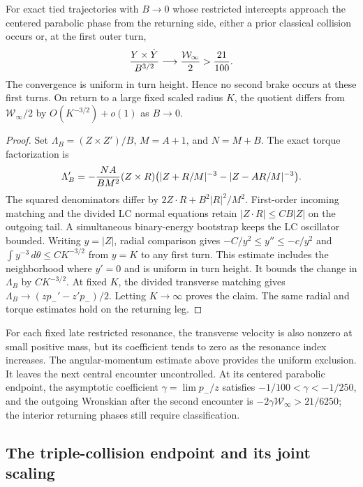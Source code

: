 \begin{theorem}\label{thm:first-turn}
For exact tied trajectories with $B\to0$ whose restricted intercepts
approach the centered parabolic phase from the returning side, either a
prior classical collision occurs or, at the first outer turn,
\[
 {Y\times\dot Y\over B^{3/2}}\longrightarrow
 {\mathcal W_\infty\over2}>{21\over100}.
\]
The convergence is uniform in turn height. Hence no second brake occurs
at these first turns. On return to a large fixed scaled radius $K$, the
quotient differs from $\mathcal W_\infty/2$ by
$O(K^{-3/2})+o(1)$ as $B\to0$.
\end{theorem}
\begin{proof}
Set $\Lambda_B=(Z\times Z')/B$, $M=A+1$, and $N=M+B$.
The exact torque factorization is
\[
 \Lambda_B'=-{NA\over BM^2}(Z\times R)
 \bigl(|Z+R/M|^{-3}-|Z-AR/M|^{-3}\bigr).
\]
The squared denominators differ by
$2Z\cdot R+B^2|R|^2/M^2$. First-order incoming matching and the
divided LC normal equations retain $|Z\cdot R|\le CB|Z|$ on the
outgoing tail. A simultaneous binary-energy bootstrap keeps the LC
oscillator bounded. Writing $y=|Z|$, radial comparison gives
$-C/y^2\le y''\le-c/y^2$ and
$\int y^{-3}\,d\theta\le CK^{-3/2}$ from $y=K$ to any first turn.
This estimate includes the neighborhood where $y'=0$ and is uniform in
turn height. It bounds the change in $\Lambda_B$ by $CK^{-3/2}$.
At fixed $K$, the divided transverse matching gives
$\Lambda_B\to(zp_-'-z'p_-)/2$. Letting $K\to\infty$ proves the
claim. The same radial and torque estimates hold on the returning leg.
\end{proof}

For each fixed late restricted resonance, the transverse velocity is
also nonzero at small positive mass, but its coefficient tends to zero
as the resonance index increases. The angular-momentum estimate above
provides the uniform exclusion. It leaves the next central encounter
uncontrolled. At its centered parabolic endpoint, the asymptotic
coefficient $\gamma=\lim p_-/z$ satisfies
$-1/100<\gamma<-1/250$, and the outgoing Wronskian after the second encounter is
$-2\gamma\mathcal W_\infty>21/6250$; the interior returning phases
still require classification.

\subsection{The triple-collision endpoint and its joint scaling}

